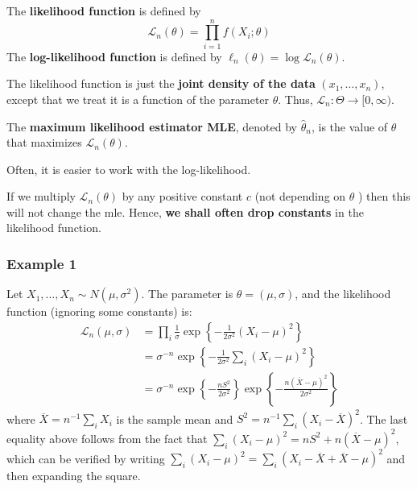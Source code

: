 \begin{definition}
The \textbf{likelihood function} is defined by
\[
\mathcal{L}_n(\theta)=\prod_{i=1}^n f\left(X_i ; \theta\right)
\]The \textbf{log-likelihood function} is defined by $\ell_n(\theta)=\log \mathcal{L}_n(\theta)$.
\end{definition}
The likelihood function is just the \textbf{joint density of the data} $(x_1,\dots,x_n)$, except that we treat it is a function of the parameter $\theta$. Thus, $\mathcal{L}_n: \Theta \rightarrow[0, \infty)$.

\begin{definition}
The \textbf{maximum likelihood estimator MLE}, denoted by $\widehat{\theta}_n$, is the value of $\theta$ that maximizes $\mathcal{L}_n(\theta)$.
\end{definition}
\begin{note}
Often, it is easier to work with the log-likelihood.
\end{note}
\begin{remark}
If we multiply $\mathcal{L}_n(\theta)$ by any positive constant $c$ (not depending on $\theta$ ) then this will not change the mle. Hence, \textbf{we shall often drop constants} in the likelihood function.
\end{remark}
\subsubsection{Example 1}

Let $X_1, \ldots, X_n \sim N\left(\mu, \sigma^2\right)$. The parameter is $\theta=(\mu, \sigma)$, and the likelihood function (ignoring some constants) is:
\[
\begin{aligned}
\mathcal{L}_n(\mu, \sigma) & =\prod_i \frac{1}{\sigma} \exp \left\{-\frac{1}{2 \sigma^2}\left(X_i-\mu\right)^2\right\} \\
& =\sigma^{-n} \exp \left\{-\frac{1}{2 \sigma^2} \sum_i\left(X_i-\mu\right)^2\right\} \\
& =\sigma^{-n} \exp \left\{-\frac{n S^2}{2 \sigma^2}\right\} \exp \left\{-\frac{n(\overline{X}-\mu)^2}{2 \sigma^2}\right\}
\end{aligned}
\]
where $\overline{X}=n^{-1} \sum_i X_i$ is the sample mean and $S^2=n^{-1} \sum_i\left(X_i-\overline{X}\right)^2$. The last equality above follows from the fact that $\sum_i\left(X_i-\mu\right)^2=n S^2+n(\overline{X}-\mu)^2$, which can be verified by writing $\sum_i\left(X_i-\mu\right)^2=\sum_i\left(X_i-\overline{X}+\overline{X}-\mu\right)^2$ and then expanding the square.

